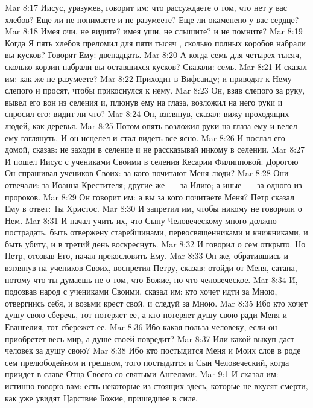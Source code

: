 \vs Mar 8:17 Иисус, уразумев, говорит им: что рассуждаете о том, что нет у вас хлебов? Еще ли не понимаете и не разумеете? Еще ли окаменено у вас сердце?
\vs Mar 8:18 Имея очи, не видите? имея уши, не слышите? и не помните?
\vs Mar 8:19 Когда Я пять хлебов преломил для пяти тысяч , сколько полных коробов набрали вы кусков? Говорят Ему: двенадцать.
\vs Mar 8:20 А когда семь для четырех тысяч, сколько корзин набрали вы оставшихся кусков? Сказали: семь.
\vs Mar 8:21 И сказал им: как же не разумеете?
\rsbpar\vs Mar 8:22 Приходит в Вифсаиду; и приводят к Нему слепого и просят, чтобы прикоснулся к нему.
\vs Mar 8:23 Он, взяв слепого за руку, вывел его вон из селения и, плюнув ему на глаза, возложил на него руки и спросил его: видит ли что?
\vs Mar 8:24 Он, взглянув, сказал: вижу проходящих людей, как деревья.
\vs Mar 8:25 Потом опять возложил руки на глаза ему и велел ему взглянуть. И он исцелел и стал видеть все ясно.
\vs Mar 8:26 И послал его домой, сказав: не заходи в селение и не рассказывай никому в селении.
\rsbpar\vs Mar 8:27 И пошел Иисус с учениками Своими в селения Кесарии Филипповой. Дорогою Он спрашивал учеников Своих: за кого почитают Меня люди?
\vs Mar 8:28 Они отвечали: за Иоанна Крестителя; другие же~--- за Илию; а иные~--- за одного из пророков.
\vs Mar 8:29 Он говорит им: а вы за кого почитаете Меня? Петр сказал Ему в ответ: Ты Христос.
\vs Mar 8:30 И запретил им, чтобы никому не говорили о Нем.
\vs Mar 8:31 И начал учить их, что Сыну Человеческому много должно пострадать, быть отвержену старейшинами, первосвященниками и книжниками, и быть убиту, и в третий день воскреснуть.
\vs Mar 8:32 И говорил о сем открыто. Но Петр, отозвав Его, начал прекословить Ему.
\vs Mar 8:33 Он же, обратившись и взглянув на учеников Своих, воспретил Петру, сказав: отойди от Меня, сатана, потому что ты думаешь не о том, что Божие, но что человеческое.
\vs Mar 8:34 И, подозвав народ с учениками Своими, сказал им: кто хочет идти за Мною, отвергнись себя, и возьми крест свой, и следуй за Мною.
\vs Mar 8:35 Ибо кто хочет душу свою сберечь, тот потеряет ее, а кто потеряет душу свою ради Меня и Евангелия, тот сбережет ее.
\vs Mar 8:36 Ибо какая польза человеку, если он приобретет весь мир, а душе своей повредит?
\vs Mar 8:37 Или какой выкуп даст человек за душу свою?
\vs Mar 8:38 Ибо кто постыдится Меня и Моих слов в роде сем прелюбодейном и грешном, того постыдится и Сын Человеческий, когда приидет в славе Отца Своего со святыми Ангелами.
\vs Mar 9:1 И сказал им: истинно говорю вам: есть некоторые из стоящих здесь, которые не вкусят смерти, как уже увидят Царствие Божие, пришедшее в силе.
